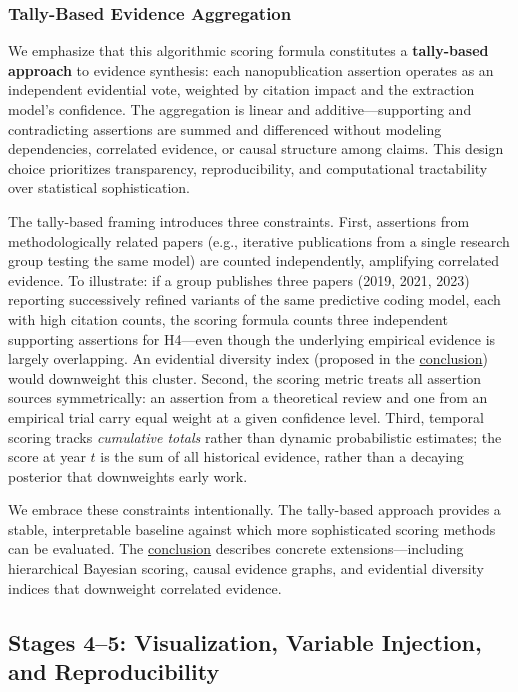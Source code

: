 \documentclass[
  english,
]{article}
\begin{document}
\subsubsection{Tally-Based Evidence
Aggregation}\label{tally-based-evidence-aggregation}

We emphasize that this algorithmic scoring formula constitutes a
\textbf{tally-based approach} to evidence synthesis: each
nanopublication assertion operates as an independent evidential vote,
weighted by citation impact and the extraction model's confidence. The
aggregation is linear and additive---supporting and contradicting
assertions are summed and differenced without modeling dependencies,
correlated evidence, or causal structure among claims. This design
choice prioritizes transparency, reproducibility, and computational
tractability over statistical sophistication.

The tally-based framing introduces three constraints. First, assertions
from methodologically related papers (e.g., iterative publications from
a single research group testing the same model) are counted
independently, amplifying correlated evidence. To illustrate: if a group
publishes three papers (2019, 2021, 2023) reporting successively refined
variants of the same predictive coding model, each with high citation
counts, the scoring formula counts three independent supporting
assertions for H4---even though the underlying empirical evidence is
largely overlapping. An evidential diversity index (proposed in the
\hyperref[sec:conclusion]{conclusion}) would downweight this cluster.
Second, the scoring metric treats all assertion sources symmetrically:
an assertion from a theoretical review and one from an empirical trial
carry equal weight at a given confidence level. Third, temporal scoring
tracks \emph{cumulative totals} rather than dynamic probabilistic
estimates; the score at year \(t\) is the sum of all historical
evidence, rather than a decaying posterior that downweights early work.

We embrace these constraints intentionally. The tally-based approach
provides a stable, interpretable baseline against which more
sophisticated scoring methods can be evaluated. The
\hyperref[sec:conclusion]{conclusion} describes concrete
extensions---including hierarchical Bayesian scoring, causal evidence
graphs, and evidential diversity indices that downweight correlated
evidence.

\newpage

\subsection{Stages 4--5: Visualization, Variable Injection, and
Reproducibility}\label{sec:methods_viz}
\end{document}
